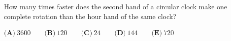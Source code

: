 How many times faster does the second hand of a circular clock make one complete rotation than the hour hand of the same clock?

$\textbf{(A)}\ 3600\qquad\textbf{(B)}\ 120\qquad\textbf{(C)}\ 24\qquad\textbf{(D)}\ 144\qquad\textbf{(E)}\ 720$
